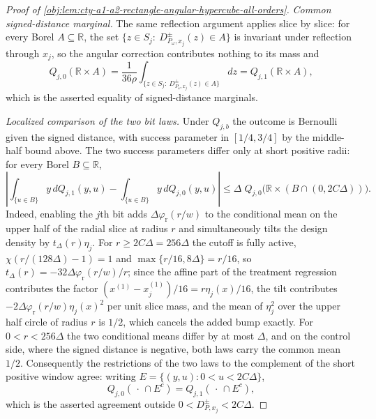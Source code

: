 \begin{proof}[Proof of \cref{obj:lem:cty-a1-a2-rectangle-angular-hypercube-all-orders}]
\emph{Common signed-distance marginal.}
The same reflection argument applies slice by slice: for every Borel \(A\subseteq\mathbb R\), the set \(\{z\in S_j:\ D^{\pm}_{P_\omega,x_j}(z)\in A\}\) is invariant under reflection through \(x_j\), so the angular correction contributes nothing to its mass and
\[
Q_{j,0}(\mathbb R\times A)
=
\frac1{36\rho}\int_{\{z\in S_j:\ D^{\pm}_{P_\omega,x_j}(z)\in A\}}dz
=
Q_{j,1}(\mathbb R\times A),
\]
which is the asserted equality of signed-distance marginals.

\emph{Localized comparison of the two bit laws.}
Under \(Q_{j,b}\) the outcome is Bernoulli given the signed distance, with success parameter in \([1/4,3/4]\) by the middle-half bound above.  The two success parameters differ only at short positive radii: for every Borel \(B\subseteq\mathbb R\),
\[
\left|
\int_{\{u\in B\}} y\,dQ_{j,1}(y,u)
-
\int_{\{u\in B\}} y\,dQ_{j,0}(y,u)
\right|
\leq
\Delta\;Q_{j,0}\bigl(\mathbb R\times(B\cap(0,2C\Delta))\bigr).
\]
Indeed, enabling the \(j\)th bit adds \(\Delta\varphi_{\mathrm r}(r/w)\) to the conditional mean on the upper half of the radial slice at radius \(r\) and simultaneously tilts the design density by \(t_\Delta(r)\eta_j\).  For \(r\geq2C\Delta=256\Delta\) the cutoff is fully active, \(\chi(r/(128\Delta)-1)=1\) and \(\max\{r/16,8\Delta\}=r/16\), so \(t_\Delta(r)=-32\Delta\varphi_{\mathrm r}(r/w)/r\); since the affine part of the treatment regression contributes the factor \((x^{(1)}-x_j^{(1)})/16=r\eta_j(x)/16\), the tilt contributes \(-2\Delta\varphi_{\mathrm r}(r/w)\eta_j(x)^2\) per unit slice mass, and the mean of \(\eta_j^2\) over the upper half circle of radius \(r\) is \(1/2\), which cancels the added bump exactly.  For \(0<r<256\Delta\) the two conditional means differ by at most \(\Delta\), and on the control side, where the signed distance is negative, both laws carry the common mean \(1/2\).
Consequently the restrictions of the two laws to the complement of the short positive window agree: writing \(E=\{(y,u):0<u<2C\Delta\}\),
\[
Q_{j,0}(\,\cdot\,\cap E^{c})=Q_{j,1}(\,\cdot\,\cap E^{c}),
\]
which is the asserted agreement outside \(0<D^{\pm}_{P,x_j}<2C\Delta\).


\end{proof}
